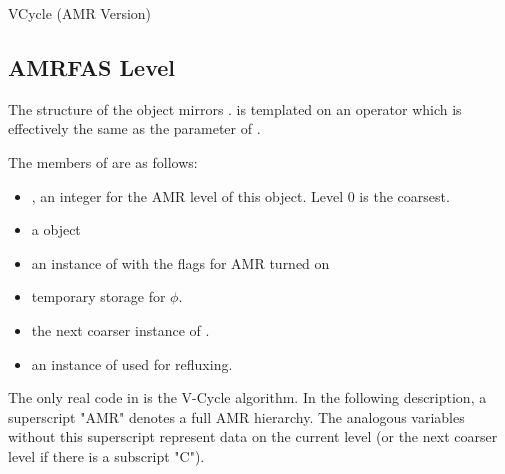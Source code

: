 \documentclass[12pt,a4paper]{article}
\begin{document}
\begin{algorithm}
\caption{VCycle (AMR Version)}
\begin{algorithmic}[1]
\Else
\EndIf
\EndProcedure
\end{algorithmic}
\end{algorithm}
\pagebreak
\subsection{AMRFAS Level}

The structure of the  object mirrors .  is templated on an operator  which is effectively the same as the  parameter of .

The members of  are as follows:

\begin{itemize}
\item {}, an integer for the AMR level of this object. Level 0 is the coarsest. 
\item {} a  object
\item {} an instance of  with the flags for AMR turned on
\item {} temporary storage for $\phi$.
\item {} the next coarser instance of .
\item {} an instance of  used for refluxing.  
\end{itemize}

The only real code in  is the V-Cycle algorithm. In the following description, a superscript "AMR" denotes a full AMR hierarchy. The analogous variables without this superscript represent data on the current level (or the next coarser level if there is a subscript "C").
\end{document}
